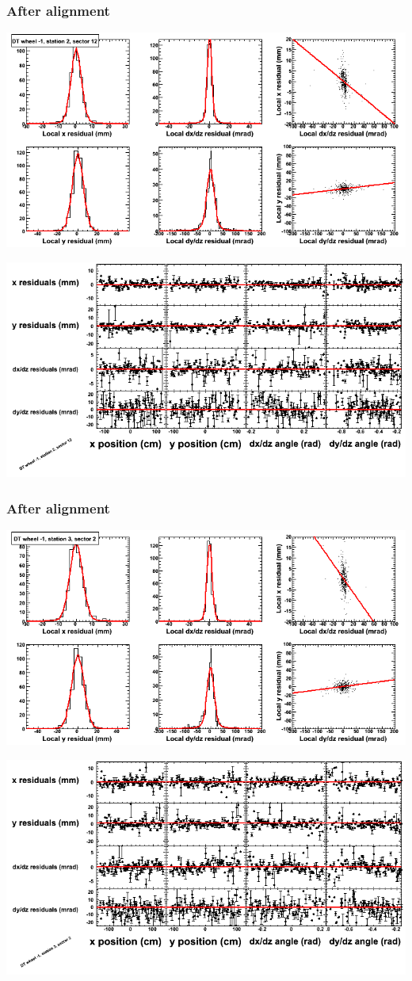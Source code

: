 \documentclass[compress]{beamer}
\begin{document}
\begin{frame}
\frametitle{After alignment}
\includegraphics[width=0.7\linewidth]{NOV4_fitfunctions/MBwhBst2sec12_bellcurves.png}

\includegraphics[width=0.7\linewidth]{NOV4_fitfunctions/MBwhBst2sec12_polynomials.png}
\end{frame}

\begin{frame}
\frametitle{After alignment}
\includegraphics[width=0.7\linewidth]{NOV4_fitfunctions/MBwhBst3sec02_bellcurves.png}

\includegraphics[width=0.7\linewidth]{NOV4_fitfunctions/MBwhBst3sec02_polynomials.png}
\end{frame}
\end{document}
